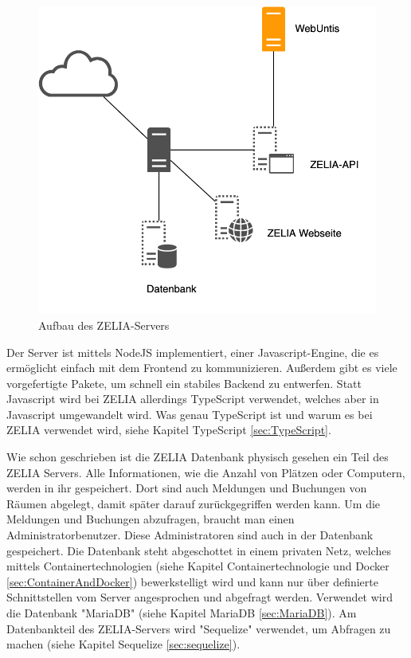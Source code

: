 \begin{figure}[H]
    \centering
    \includegraphics[width=120mm]{./media/Intro/server_arch.png}
    \caption{Aufbau des ZELIA-Servers}
\end{figure}

Der Server ist mittels NodeJS implementiert, einer Javascript-Engine, die es ermöglicht einfach mit dem Frontend zu kommunizieren. Außerdem gibt es viele vorgefertigte Pakete, um schnell ein stabiles Backend zu entwerfen. Statt Javascript wird bei ZELIA allerdings TypeScript verwendet, welches aber in Javascript umgewandelt wird. Was genau TypeScript ist und warum es bei ZELIA verwendet wird, siehe Kapitel TypeScript \ref{sec:TypeScript}.


Wie schon geschrieben ist die ZELIA Datenbank physisch gesehen ein Teil des ZELIA Servers. Alle Informationen, wie die Anzahl von Plätzen oder Computern, werden in ihr gespeichert. Dort sind auch Meldungen und Buchungen von Räumen abgelegt, damit später darauf zurückgegriffen werden kann. Um die Meldungen und Buchungen abzufragen, braucht man einen Administratorbenutzer. Diese Administratoren sind auch in der Datenbank gespeichert. Die Datenbank steht abgeschottet in einem privaten Netz, welches mittels Containertechnologien (siehe Kapitel Containertechnologie und Docker \ref{sec:ContainerAndDocker}) bewerkstelligt wird und kann nur über definierte Schnittstellen vom Server angesprochen und abgefragt werden. Verwendet wird die Datenbank "MariaDB" (siehe Kapitel MariaDB \ref{sec:MariaDB}). Am Datenbankteil des ZELIA-Servers wird "Sequelize" verwendet, um Abfragen zu machen (siehe Kapitel Sequelize \ref{sec:sequelize}).


